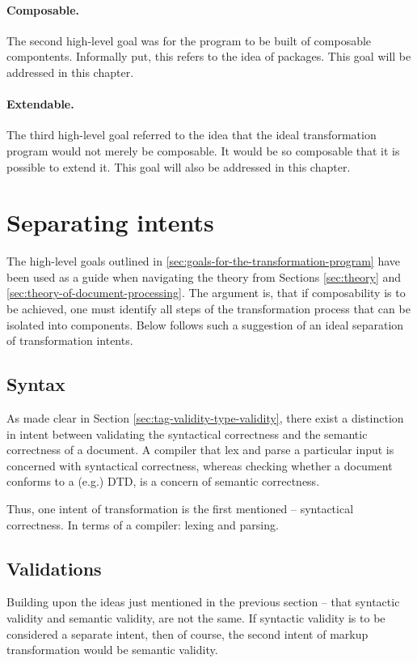 \documentclass{scrreprt}
\begin{document}
\paragraph{Composable.} The second high-level goal was for the program to be built of composable compontents. Informally put, this refers to the idea of packages. This goal will be addressed in this chapter.

\paragraph{Extendable.} The third high-level goal referred to the idea that the ideal transformation program would not merely be composable. It would be so composable that it is possible to extend it. This goal will also be addressed in this chapter.



\section{Separating intents}
The high-level goals outlined in \ref{sec:goals-for-the-transformation-program} have been used as a guide when navigating the theory from Sections \ref{sec:theory} and \ref{sec:theory-of-document-processing}. The argument is, that if composability is to be achieved, one must identify all steps of the transformation process that can be isolated into components. Below follows such a suggestion of an ideal separation of transformation intents.


\subsection{Syntax}
As made clear in Section \ref{sec:tag-validity-type-validity}, there exist a distinction in intent between validating the syntactical correctness and the semantic correctness of a document. A compiler that lex and parse a particular input is concerned with syntactical correctness, whereas checking whether a document conforms to a (e.g.) DTD, is a concern of semantic correctness.

Thus, one intent of transformation is the first mentioned -- syntactical correctness. In terms of a compiler: lexing and parsing.

\subsection{Validations}
Building upon the ideas just mentioned in the previous section -- that syntactic validity and semantic validity, are not the same. If syntactic validity is to be considered a separate intent, then of course, the second intent of markup transformation would be semantic validity.
\end{document}
